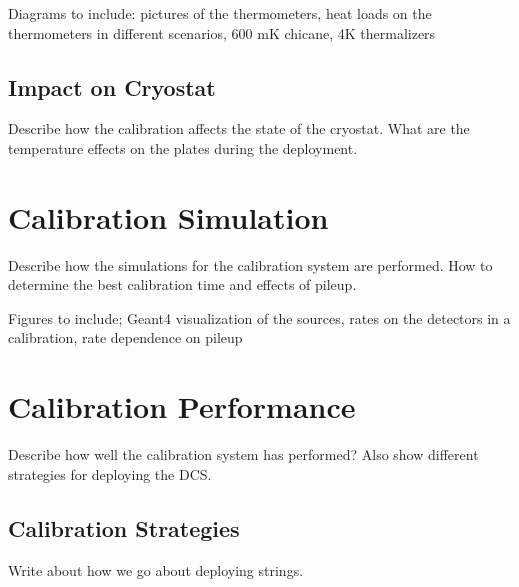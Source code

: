 Diagrams to include: pictures of the thermometers, heat loads on the thermometers in different scenarios, 600 mK chicane, 4K thermalizers
\subsection{Impact on Cryostat}

Describe how the calibration affects the state of the cryostat. What are the temperature effects on the plates during the deployment.


\section{Calibration Simulation}
Describe how the simulations for the calibration system are performed. How to determine the best calibration time and effects of pileup.

Figures to include; Geant4 visualization of the sources, rates on the detectors in a calibration, rate dependence on pileup 

\section{Calibration Performance}

Describe how well the calibration system has performed? Also show different strategies for deploying the DCS.

\subsection{Calibration Strategies}

Write about how we go about deploying strings.